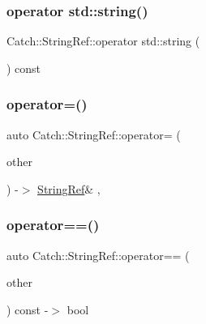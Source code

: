 \subsubsection{\texorpdfstring{operator std::string()}{operator std::string()}}
{\footnotesize\ttfamily Catch\+::\+String\+Ref\+::operator std\+::string (\begin{DoxyParamCaption}{ }\end{DoxyParamCaption}) const}

\mbox{\label{class_catch_1_1_string_ref_a14d5a1983e33c51c6b5fd33bffbebabb}} 
\subsubsection{\texorpdfstring{operator=()}{operator=()}}
{\footnotesize\ttfamily auto Catch\+::\+String\+Ref\+::operator= (\begin{DoxyParamCaption}\item[{\mbox{\hyperlink{class_catch_1_1_string_ref}{String\+Ref}} const \&}]{other }\end{DoxyParamCaption}) -\/$>$ \mbox{\hyperlink{class_catch_1_1_string_ref}{String\+Ref}}\& \hspace{0.3cm}{\ttfamily [inline]}, {\ttfamily [noexcept]}}

\mbox{\label{class_catch_1_1_string_ref_aabb30149ab961187e4b3ff3394bf6e73}} 
\subsubsection{\texorpdfstring{operator==()}{operator==()}}
{\footnotesize\ttfamily auto Catch\+::\+String\+Ref\+::operator== (\begin{DoxyParamCaption}\item[{\mbox{\hyperlink{class_catch_1_1_string_ref}{String\+Ref}} const \&}]{other }\end{DoxyParamCaption}) const -\/$>$  bool\hspace{0.3cm}{\ttfamily [noexcept]}}

\mbox{\label{class_catch_1_1_string_ref_a4ba2e01eec1f0f56c257d213c796ab3b}} 
